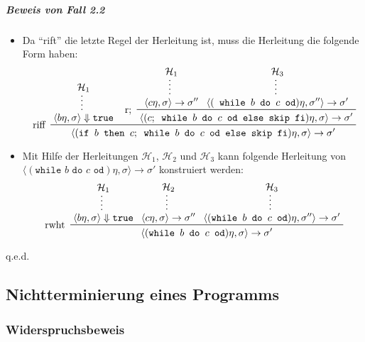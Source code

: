 \documentclass[a4paper, 11pt, accentcolor = tud3b]{tudreport}
\newcommand{\qed}{{\hfill q.e.d.}}
\begin{document}
						\subparagraph{Beweis von Fall 2.2}
						\begin{itemize}
							\item Da \enquote{rift} die letzte Regel der Herleitung ist, muss die Herleitung die folgende Form haben:
								\begin{equation*}
									\prftree[l]
										{ riff }
										{ \prfsummary{\mathcal{H} _ 1}{\langle b\eta, \sigma \rangle \Downarrow \texttt{true}} }
										{
											\prftree[l]
												{ r; }
												{ \prfsummary{\mathcal{H} _ 1}{\langle c\eta, \sigma \rangle \rightarrow \sigma''} }
												{ \prfsummary{\mathcal{H} _ 3}{\langle (\texttt{ while } b \texttt{ do } c \texttt{ od})\eta, \sigma'' \rangle \rightarrow \sigma' } }
												{ \langle (c ; \texttt{ while } b \texttt{ do } c \texttt{ od else skip fi}) \eta, \sigma \rangle \rightarrow \sigma' }
										}
										{ \langle (\texttt{if } b \texttt{ then } c ; \texttt{ while } b \texttt{ do } c \texttt{ od else skip fi})\eta, \sigma \rangle \rightarrow \sigma' }
								\end{equation*}
							\item Mit Hilfe der Herleitungen $ \mathcal{H} _ 1 $, $ \mathcal{H} _ 2 $ und $ \mathcal{H} _ 3 $ kann folgende Herleitung von \\ $ \langle (\texttt{while } b \texttt{ do } c \texttt{ od}) \eta, \sigma \rangle \rightarrow \sigma' $ konstruiert werden:
								\begin{equation*}
									\prftree[l]
										{ rwht }
										{ \prfsummary{\mathcal{H} _ 1}{\langle b\eta, \sigma \rangle \Downarrow \texttt{true}} }
										{ \prfsummary{\mathcal{H} _ 2}{\langle c\eta, \sigma \rangle \rightarrow \sigma''} }
										{ \prfsummary{\mathcal{H} _ 3}{\langle (\texttt{while } b \texttt{ do } c \texttt{ od}) \eta, \sigma'' \rangle \rightarrow \sigma'}  }
										{ \langle (\texttt{while } b \texttt{ do } c \texttt{ od}) \eta, \sigma \rangle \rightarrow \sigma' }
								\end{equation*}
						\end{itemize}
						
						\qed
		    
		    \subsection{Nichtterminierung eines Programms}
			    \subsubsection{Widerspruchsbeweis}
\end{document}

